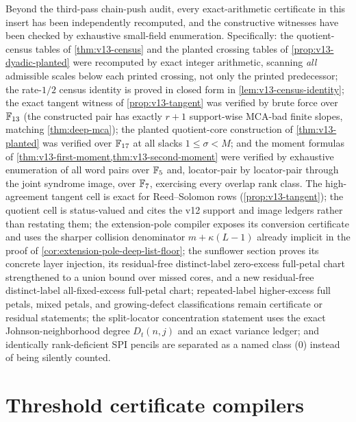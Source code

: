 \begin{remark}\label{rem:v13-verification}
Beyond the third-pass chain-push audit, every exact-arithmetic certificate in this insert has been independently recomputed, and the constructive witnesses have been checked by exhaustive small-field enumeration.  Specifically: the quotient-census tables of \cref{thm:v13-census} and the planted crossing tables of \cref{prop:v13-dyadic-planted} were recomputed by exact integer arithmetic, scanning \emph{all} admissible scales below each printed crossing, not only the printed predecessor; the rate-$1/2$ census identity is proved in closed form in \cref{lem:v13-census-identity}; the exact tangent witness of \cref{prop:v13-tangent} was verified by brute force over $\mathbb F_{13}$ \textup(the constructed pair has exactly $r+1$ support-wise MCA-bad finite slopes, matching \cref{thm:deep-mca}\textup); the planted quotient-core construction of \cref{thm:v13-planted} was verified over $\mathbb F_{17}$ at all slacks $1\le\sigma<M$; and the moment formulas of \cref{thm:v13-first-moment,thm:v13-second-moment} were verified by exhaustive enumeration of all word pairs over $\mathbb F_5$ and, locator-pair by locator-pair through the joint syndrome image, over $\mathbb F_7$, exercising every overlap rank class.  The high-agreement tangent cell is exact for Reed--Solomon rows \textup(\cref{prop:v13-tangent}\textup); the quotient cell is status-valued and cites the v12 support and image ledgers rather than restating them; the extension-pole compiler exposes its conversion certificate and uses the sharper collision denominator $m+\kappa(L-1)$ already implicit in the proof of \cref{cor:extension-pole-deep-list-floor}; the sunflower section proves its concrete layer injection, its residual-free distinct-label zero-excess full-petal chart strengthened to a union bound over missed cores, and a new residual-free distinct-label all-fixed-excess full-petal chart; repeated-label higher-excess full petals, mixed petals, and growing-defect classifications remain certificate or residual statements; the split-locator concentration statement uses the exact Johnson-neighborhood degree $D_t(n,j)$ and an exact variance ledger; and identically rank-deficient SPI pencils are separated as a named class \textup(0\textup) instead of being silently counted.
\end{remark}

\section{Threshold certificate compilers}\label{sec:v13-threshold}

